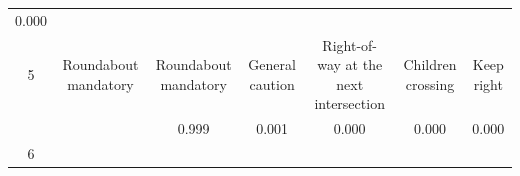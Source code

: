 \documentclass[11pt]{article}
\begin{document}
\begin{longtable}[]{@{}ccccccc@{}}
\begin{minipage}[t]{0.04\columnwidth}
0.000\strut
\end{minipage}\tabularnewline
\begin{minipage}[t]{0.04\columnwidth}\centering\strut
5\strut
\end{minipage} & \begin{minipage}[t]{0.04\columnwidth}\centering\strut
Roundabout mandatory\strut
\end{minipage} & \begin{minipage}[t]{0.04\columnwidth}\centering\strut
Roundabout mandatory\strut
\end{minipage} & \begin{minipage}[t]{0.04\columnwidth}\centering\strut
General caution\strut
\end{minipage} & \begin{minipage}[t]{0.04\columnwidth}\centering\strut
Right-of-way at the next intersection\strut
\end{minipage} & \begin{minipage}[t]{0.04\columnwidth}\centering\strut
Children crossing\strut
\end{minipage} & \begin{minipage}[t]{0.04\columnwidth}\centering\strut
Keep right\strut
\end{minipage}\tabularnewline
\begin{minipage}[t]{0.04\columnwidth}\centering\strut
\strut
\end{minipage} & \begin{minipage}[t]{0.04\columnwidth}\centering\strut
\strut
\end{minipage} & \begin{minipage}[t]{0.04\columnwidth}\centering\strut
0.999\strut
\end{minipage} & \begin{minipage}[t]{0.04\columnwidth}\centering\strut
0.001\strut
\end{minipage} & \begin{minipage}[t]{0.04\columnwidth}\centering\strut
0.000\strut
\end{minipage} & \begin{minipage}[t]{0.04\columnwidth}\centering\strut
0.000\strut
\end{minipage} & \begin{minipage}[t]{0.04\columnwidth}\centering\strut
0.000\strut
\end{minipage}\tabularnewline
\begin{minipage}[t]{0.04\columnwidth}\centering\strut
6\strut
\end{minipage} & \begin{minipage}[t]{0.04\columnwidth}\centering\strut

\end{minipage}
\end{longtable}
\end{document}
